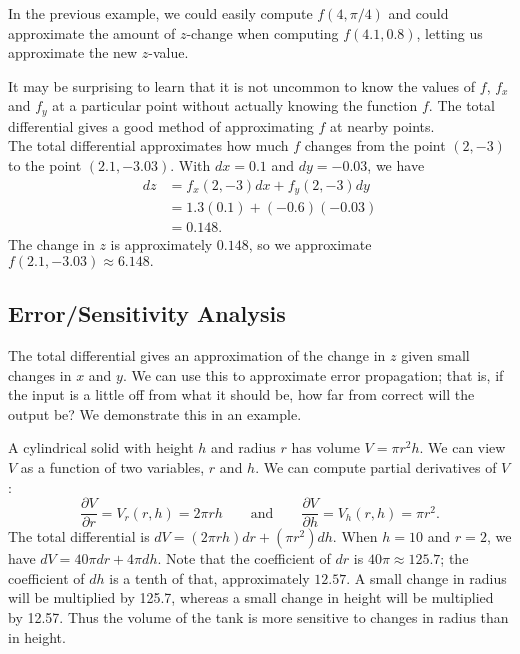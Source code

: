 In the previous example, we could easily compute $f(4,\pi/4)$ and could approximate the amount of $z$-change when computing $f(4.1,0.8)$, letting us approximate the new $z$-value.

It may be surprising to learn that it is not uncommon to know the values of $f$, $f_x$ and $f_y$ at a particular point without actually knowing the function $f$. The total differential gives a good method of approximating $f$ at nearby points.\\

{The total differential approximates how much $f$ changes from the point $(2,-3)$ to the point $(2.1,-3.03)$. With $dx = 0.1$ and $dy = -0.03$, we have
\begin{align*}
dz &= f_x(2,-3)dx + f_y(2,-3)dy\\
		&= 1.3(0.1) + (-0.6)(-0.03) \\
		&= 0.148.
\end{align*}
The change in $z$ is approximately $0.148$, so we approximate $f(2.1,-3.03)\approx 6.148.$}

\subsection*{Error/Sensitivity Analysis}

The total differential gives an approximation of the change in $z$ given small changes in $x$ and $y$. We can use this to approximate error propagation; that is, if the input is a little off from what it should be, how far from correct will the output be? We demonstrate this in an example.

{A cylindrical solid with height $h$ and radius $r$ has volume $V = \pi r^2h$. We can view $V$ as a function of two variables, $r$ and $h$. We can compute partial derivatives of $V$:
$$\frac{\partial V}{\partial r} = V_r(r,h) = 2\pi rh \qquad \text{and}\qquad \frac{\partial V}{\partial h} = V_h(r,h) = \pi r^2.$$
The total differential is $dV = (2\pi rh)dr + (\pi r^2)dh.$ When $h = 10$ and $r = 2$, we have $dV = 40\pi dr + 4\pi dh$.
Note that the coefficient of $dr$ is $40\pi\approx 125.7$; the coefficient of $dh$ is a tenth of that, approximately $12.57$. A small change in radius will be multiplied by 125.7, whereas a small change in height will be multiplied by 12.57. Thus the volume of the tank is more sensitive to changes in radius than in height.}

